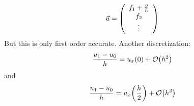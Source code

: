 \documentclass{article}
\begin{document}
            \begin{align}
                \vec{u} = \qty(\begin{array}{c}f_1 + \frac{g}{h} \\ f_2 \\ \vdots \end{array})
            \end{align}
            But this is only first order accurate.  Another discretization:
            \begin{align}
                \frac{u_1 - u_0}{h} = u_x(0) + \order{h^2}
            \end{align}
            and
            \begin{align}
                \frac{u_1 - u_0}{h} = u_x\qty(\frac{h}{2}) + \order{h^2}
            \end{align}
\end{document}
